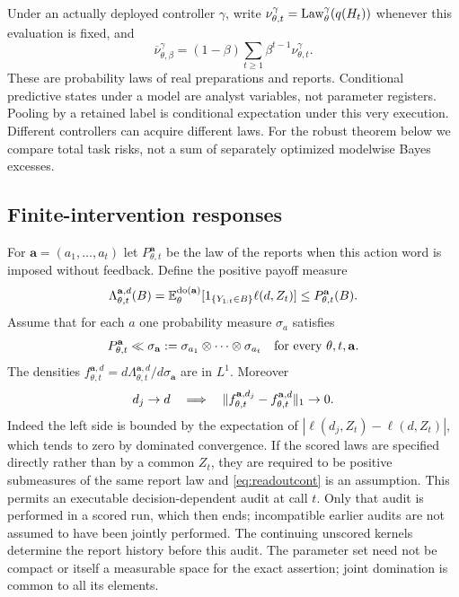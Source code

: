 Under an actually deployed controller $\gamma$, write $\nu_{\theta,t}^{\gamma}=\operatorname{Law}_\theta^\gamma(q(H_t))$ whenever this evaluation is fixed, and
\begin{equation}\label{eq:acquired}
 \overline\nu_{\theta,\beta}^{\gamma}
 =(1-\beta)\sum_{t\ge1}\beta^{t-1}\nu_{\theta,t}^{\gamma}.
\end{equation}
These are probability laws of real preparations and reports. Conditional predictive states under a model are analyst variables, not parameter registers. Pooling by a retained label is conditional expectation under this very execution. Different controllers can acquire different laws. For the robust theorem below we compare total task risks, not a sum of separately optimized modelwise Bayes excesses.

\subsection{Finite-intervention responses}
For $\mathbf a=(a_1,\ldots,a_t)$ let $P_{\theta,t}^{\mathbf a}$ be the law of the reports when this action word is imposed without feedback. Define the positive payoff measure
\begin{equation}\label{eq:response}
 \Lambda_{\theta,t}^{\mathbf a,d}(B)
 =\mathbb E_\theta^{\operatorname{do}(\mathbf a)}
       [1_{\{Y_{1:t}\in B\}}\ell(d,Z_t)]\le P_{\theta,t}^{\mathbf a}(B).
\end{equation}
Assume that for each $a$ one probability measure $\sigma_a$ satisfies
\begin{equation}\label{eq:domination}
 P_{\theta,t}^{\mathbf a}\ll \sigma_{\mathbf a}
 :=\sigma_{a_1}\otimes\cdots\otimes\sigma_{a_t}
 \quad\hbox{for every }\theta,t,\mathbf a.
\end{equation}
The densities $f_{\theta,t}^{\mathbf a,d}=d\Lambda_{\theta,t}^{\mathbf a,d}/d\sigma_{\mathbf a}$ are in $L^1$. Moreover
\begin{equation}\label{eq:readoutcont}
 d_j\to d\quad\Longrightarrow\quad
 \lVert f_{\theta,t}^{\mathbf a,d_j}-f_{\theta,t}^{\mathbf a,d}\rVert_1\to0.
\end{equation}
Indeed the left side is bounded by the expectation of
$|\ell(d_j,Z_t)-\ell(d,Z_t)|$, which tends to zero by dominated convergence. If the scored laws are specified directly rather than by a common $Z_t$, they are required to be positive submeasures of the same report law and \eqref{eq:readoutcont} is an assumption. This permits an executable decision-dependent audit at call $t$. Only that audit is performed in a scored run, which then ends; incompatible earlier audits are not assumed to have been jointly performed. The continuing unscored kernels determine the report history before this audit. The parameter set need not be compact or itself a measurable space for the exact assertion; joint domination is common to all its elements.

